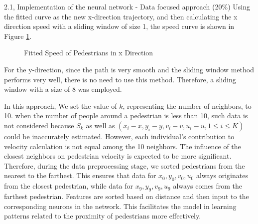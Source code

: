 \begin{task}{2.1, Implementation of the neural network - Data focused approach (20\%)}
Using the fitted curve as the new x-direction trajectory, and then calculating the x direction speed with a sliding window of size 1, the speed curve is shown in Figure \ref{pedestrain speed fit}.

\begin{figure}[H]
\centering
{}
\caption{Fitted Speed of Pedestrians in x Direction}
\label{pedestrain speed fit}
\end{figure}

For the y-direction, since the path is very smooth and the sliding window method performs very well, there is no need to use this method. Therefore, a sliding window with a size of 8 was employed.

In this approach, We set the value of \(k\), representing the number of neighbors, to 10. when the number of people around a pedestrian is less than 10, such data is not considered because $S_k$ as well as $(x_i-x, y_i-y, v_i-v, u_i-u, 1 \leq i \leq K)$ could be inaccurately estimated. However, each individual's contribution to velocity calculation is not equal among the 10 neighbors. The influence of the closest neighbors on pedestrian velocity is expected to be more significant. Therefore, during the data preprocessing stage, we sorted pedestrians from the nearest to the farthest. This ensures that data for \(x_0, y_0, v_0, u_0\) always originates from the closest pedestrian, while data for \(x_9, y_9, v_9, u_9\) always comes from the farthest pedestrian. Features are sorted based on distance and then input to the corresponding neurons in the network. This facilitates the model in learning patterns related to the proximity of pedestrians more effectively.


\end{task}
